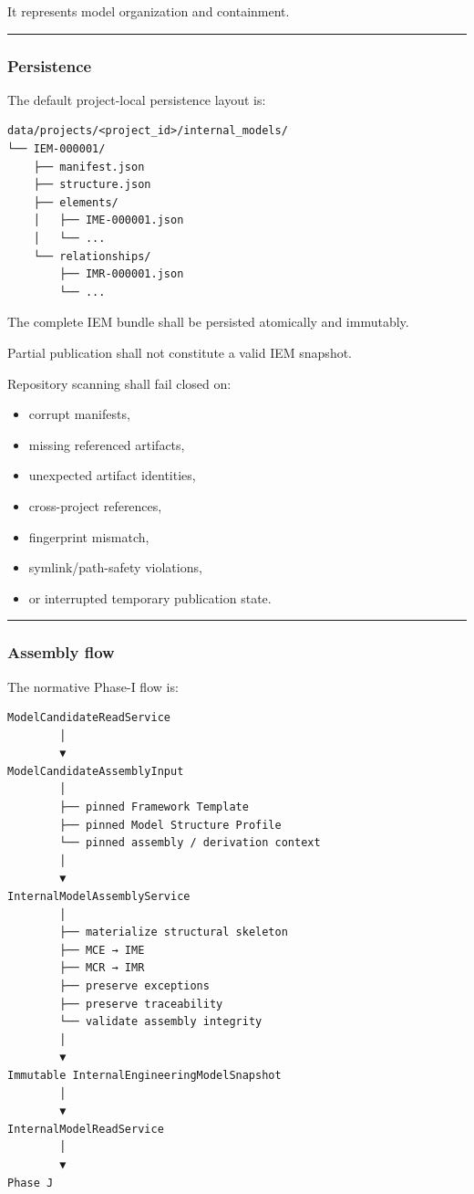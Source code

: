 It represents model organization and containment.

\begin{center}\rule{0.5\linewidth}{0.5pt}\end{center}

\hypertarget{persistence-1}{%
\subsubsection{Persistence}\label{persistence-1}}

The default project-local persistence layout is:

\begin{verbatim}
data/projects/<project_id>/internal_models/
└── IEM-000001/
    ├── manifest.json
    ├── structure.json
    ├── elements/
    │   ├── IME-000001.json
    │   └── ...
    └── relationships/
        ├── IMR-000001.json
        └── ...
\end{verbatim}

The complete IEM bundle shall be persisted atomically and immutably.

Partial publication shall not constitute a valid IEM snapshot.

Repository scanning shall fail closed on:

\begin{itemize}
\tightlist
\item
  corrupt manifests,
\item
  missing referenced artifacts,
\item
  unexpected artifact identities,
\item
  cross-project references,
\item
  fingerprint mismatch,
\item
  symlink/path-safety violations,
\item
  or interrupted temporary publication state.
\end{itemize}

\begin{center}\rule{0.5\linewidth}{0.5pt}\end{center}

\hypertarget{assembly-flow}{%
\subsubsection{Assembly flow}\label{assembly-flow}}

The normative Phase-I flow is:

\begin{verbatim}
ModelCandidateReadService
        │
        ▼
ModelCandidateAssemblyInput
        │
        ├── pinned Framework Template
        ├── pinned Model Structure Profile
        └── pinned assembly / derivation context
        │
        ▼
InternalModelAssemblyService
        │
        ├── materialize structural skeleton
        ├── MCE → IME
        ├── MCR → IMR
        ├── preserve exceptions
        ├── preserve traceability
        └── validate assembly integrity
        │
        ▼
Immutable InternalEngineeringModelSnapshot
        │
        ▼
InternalModelReadService
        │
        ▼
Phase J
\end{verbatim}


